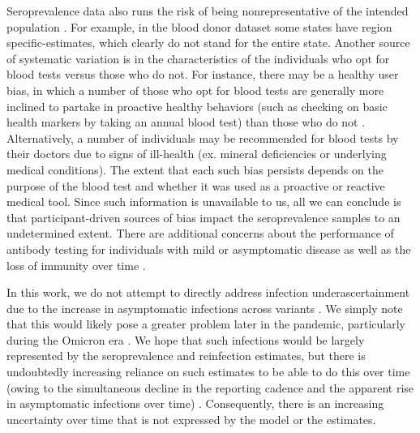 \documentclass{article}
\begin{document}
Seroprevalence data also runs the risk of being nonrepresentative of the
intended population \citep{bajema2021estimated}. For example, in the blood donor
dataset some states have region specific-estimates, which clearly do not stand
for the entire state. Another source of systematic variation is in the
characteristics of the individuals who opt for blood tests versus those who do
not. For instance, there may be a healthy user bias, in which a number of those
who opt for blood tests are generally more inclined to partake in proactive
healthy behaviors (such as checking on basic health markers by taking an annual
blood test) than those who do not \citep{parsley2018blood}. Alternatively, a
number of individuals may be recommended for blood tests by their doctors due to
signs of ill-health (ex. mineral deficiencies or underlying medical
conditions). The extent that each such bias persists depends on the purpose of
the blood test and whether it was used as a proactive or reactive medical tool.
Since such information is unavailable to us, all we can conclude is that
participant-driven sources of bias impact the seroprevalence samples to an
undetermined extent. There are additional concerns about the performance of
antibody testing for individuals with mild or asymptomatic disease as well as
the loss of immunity over time \citep{kaku2021performance, seow2020longitudinal,
ibarrondo2020rapid}.

In this work, we do not attempt to directly address infection underascertainment
due to the increase in asymptomatic infections across variants
\citep{pho2023covid19}. We simply note that this would likely pose a greater
problem later in the pandemic, particularly during the Omicron era
\citep{fan2022sars}. We hope that such infections would be largely represented
by the seroprevalence and reinfection estimates, but there is undoubtedly
increasing reliance on such estimates to be able to do this over time (owing to
the simultaneous decline in the reporting cadence and the apparent rise in
asymptomatic infections over time) \citep{oph2022covid, garrett2022high,
blauer2022reduce, ren2021asymptomatic}. Consequently, there is an increasing
uncertainty over time that is not expressed by the model or the estimates.   
\end{document}
